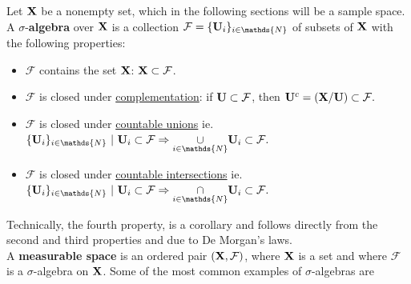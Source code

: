 \documentclass{homework}
\begin{document}
Let ${\bf X}$ be a nonempty set, which in the following sections will be a sample space. A $\sigma$-\textbf{algebra} over ${\bf X}$ is a collection $\mathcal{F} = \{{\bf U}_i\}_{i \in \mathds{N}}$ of subsets of ${\bf X}$ with the following properties:

\begin{itemize}
    \item $\mathcal{F}$ contains the set ${\bf X}$: ${\bf X} \subset \mathcal{F}$. \\
    \item { $\mathcal{F}$ is closed under \underline{complementation}: if ${\bf U} \subset \mathcal{F}$, then } $ 
    {\bf U}^c = ({\bf X} / {\bf U}) \subset \mathcal{F}.
    $\\
    \item $\mathcal{F}$ is closed under \underline{countable unions} ie. 
    $\{{\bf U}_i\}_{i \in \mathds{N}} \textnormal{ } | \textnormal{ } {\bf U}_i \subset \mathcal{F} \Rightarrow \underset{i \in \mathds{N}}{\cup} {\bf U}_i \subset \mathcal{F}.
    $\\
    \item $\mathcal{F}$ is closed under \underline{countable intersections} ie. $
    \textnormal{}
    \{{\bf U}_i\}_{i\in \mathds{N}} \textnormal{ } | \textnormal{ } {\bf U}_i \subset \mathcal{F} \Rightarrow \underset{i\in \mathds{N}}{\cap} {\bf U}_i \subset \mathcal{F}. 
    $\\
\end{itemize}

Technically, the fourth property, is a corollary and follows directly from the second and third properties and due to De Morgan's laws. \\

A \textbf{measurable space} is an ordered pair $({\bf X}, \mathcal{F})$, where ${\bf X}$ is a set and where $\mathcal{F}$ is a $\sigma$-algebra on ${\bf X}$. Some of the most common examples of $\sigma$-algebras are
\end{document}
